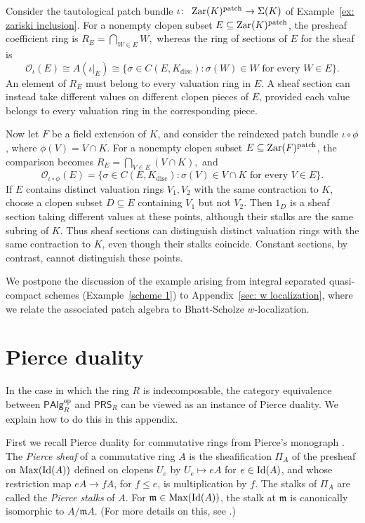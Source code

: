 \documentclass[11pt]{amsart}
\begin{document}
\begin{example}
Consider the tautological patch bundle $\iota\colon\; \operatorname{Zar}(K)^{\rm patch}\to\Sigma(K)$ of Example~\ref{ex: zariski inclusion}. For a nonempty clopen subset $E\subseteq\operatorname{Zar}(K)^{\rm patch}$, the presheaf coefficient ring is $ R_E=\bigcap_{W\in E}W, $ whereas the  ring of sections of $E$ for the sheaf is $$ \mathcal O_\iota(E) \cong  A(\iota|_E) \cong 
\{\sigma\in C(E,K_{\mathrm{disc}}):   \sigma(W)\in W\text{ for every }W\in E\}. $$
An element of $R_E$ must belong to every valuation ring in $E$. A sheaf section can instead take different values on different clopen pieces of $E$,
provided each value belongs to every valuation ring in the corresponding piece.

Now let $F$ be a field extension of $K$, and consider the reindexed patch bundle $\iota\circ\phi$, where $\phi(V)=V\cap K$. For a nonempty clopen subset
$E\subseteq\operatorname{Zar}(F)^{\rm patch}$, the comparison becomes $R_E=\bigcap_{V\in E}(V\cap K),$ and
$$ \mathcal O_{\iota\circ\phi}(E)= \{\sigma\in C(E,K_{\mathrm{disc}}):   \sigma(V)\in V\cap K\text{ for every }V\in E\}.$$
If $E$ contains distinct valuation rings $V_1,V_2$ with the same contraction to $K$, choose a clopen subset $D\subseteq E$ containing $V_1$ but not $V_2$. Then $1_D$ is a sheaf section taking different values at these points, although their stalks are the same subring of $K$.
Thus sheaf sections can distinguish distinct valuation rings with the same contraction to $K$, even though their stalks coincide.
Constant sections, by contrast, cannot distinguish these points.
\end{example}

We postpone the discussion of the example arising from integral separated quasi-compact schemes (Example~\ref{scheme 1}) to Appendix~\ref{sec: w localization}, where we relate the associated patch algebra to Bhatt-Scholze $w$-localization.

\appendix


\section[Pierce duality]{Pierce duality}\label{sec: Pierce} In the case in which the ring $R$ is indecomposable, the category equivalence between $\mathsf{PAlg}_R^{\mathrm{op}}$ and $\mathsf{PRS}_R$  can be viewed as an instance of Pierce duality. We explain how to do this in this appendix. 

First we recall Pierce duality for commutative rings from Pierce's monograph \cite{Pierce}. 
The  {\it  Pierce sheaf} of a commutative ring $A$ is the
sheafification $ \Pi_A$ of the presheaf on $\mbox{\rm Max}(\mbox{\rm Id}(A))$ defined on clopens $U_e$ by $U_e\mapsto eA$ for $e\in\mbox{\rm Id}(A)$,
and whose restriction map $eA\to fA$, for $f\le e$, is multiplication
by $f$. The stalks of $\Pi_A$ are called the {\it Pierce stalks} of $A$. For
$\mathfrak m\in\mbox{\rm Max}(\mbox{\rm Id}(A))$, the stalk at $\mathfrak m$
is canonically isomorphic to $A/\mathfrak mA$. (For more details on this, see \cite[pp. 233-234]{BV}.)
\end{document}
